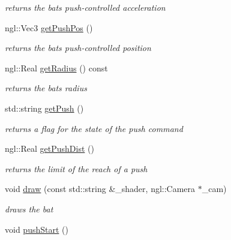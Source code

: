 \begin{DoxyCompactItemize}
\begin{DoxyCompactList}\small\item\em returns the bat\textquotesingle{}s push-\/controlled acceleration \end{DoxyCompactList}\item 
\hypertarget{class_bat_a8ac591209afc830d5f3a904d73efc9bb}{}ngl\+::\+Vec3 \hyperlink{class_bat_a8ac591209afc830d5f3a904d73efc9bb}{get\+Push\+Pos} ()\label{class_bat_a8ac591209afc830d5f3a904d73efc9bb}

\begin{DoxyCompactList}\small\item\em returns the bat\textquotesingle{}s push-\/controlled position \end{DoxyCompactList}\item 
\hypertarget{class_bat_a0a4545f994b1f26ac9ebd1043f0fcb91}{}ngl\+::\+Real \hyperlink{class_bat_a0a4545f994b1f26ac9ebd1043f0fcb91}{get\+Radius} () const \label{class_bat_a0a4545f994b1f26ac9ebd1043f0fcb91}

\begin{DoxyCompactList}\small\item\em returns the bat\textquotesingle{}s radius \end{DoxyCompactList}\item 
\hypertarget{class_bat_a2b91b886a5416294f9a75ea452148b28}{}std\+::string \hyperlink{class_bat_a2b91b886a5416294f9a75ea452148b28}{get\+Push} ()\label{class_bat_a2b91b886a5416294f9a75ea452148b28}

\begin{DoxyCompactList}\small\item\em returns a flag for the state of the push command \end{DoxyCompactList}\item 
\hypertarget{class_bat_a6b799c54fff78b0088831573bb7357bb}{}ngl\+::\+Real \hyperlink{class_bat_a6b799c54fff78b0088831573bb7357bb}{get\+Push\+Dist} ()\label{class_bat_a6b799c54fff78b0088831573bb7357bb}

\begin{DoxyCompactList}\small\item\em returns the limit of the reach of a push \end{DoxyCompactList}\item 
void \hyperlink{class_bat_a07907b3c6e056575b2b20fcbf2d6c679}{draw} (const std\+::string \&\+\_\+shader, ngl\+::\+Camera $\ast$\+\_\+cam)
\begin{DoxyCompactList}\small\item\em draws the bat \end{DoxyCompactList}\item 
\hypertarget{class_bat_a6012876b0637a7867b3256296dd74f48}{}void \hyperlink{class_bat_a6012876b0637a7867b3256296dd74f48}{push\+Start} ()\label{class_bat_a6012876b0637a7867b3256296dd74f48}


\end{DoxyCompactItemize}
